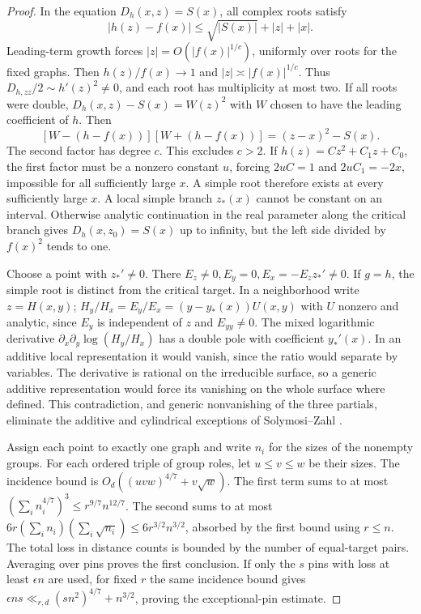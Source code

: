 \begin{proof}
In the equation \(D_h(x,z)=S(x)\), all complex roots satisfy
\[
 |h(z)-f(x)|\le\sqrt{|S(x)|}+|z|+|x|.
\]
Leading-term growth forces \(|z|=O(|f(x)|^{1/c})\), uniformly over roots for the fixed graphs. Then \(h(z)/f(x)\to1\) and \(|z|\asymp|f(x)|^{1/c}\). Thus \(D_{h,zz}/2\sim h'(z)^2\ne0\), and each root has multiplicity at most two. If all roots were double, \(D_h(x,z)-S(x)=W(z)^2\) with \(W\) chosen to have the leading coefficient of \(h\). Then
\[
 [W-(h-f(x))][W+(h-f(x))]=(z-x)^2-S(x).
\]
The second factor has degree \(c\). This excludes \(c>2\). If \(h(z)=Cz^2+C_1z+C_0\), the first factor must be a nonzero constant \(u\), forcing \(2uC=1\) and \(2uC_1=-2x\), impossible for all sufficiently large \(x\). A simple root therefore exists at every sufficiently large \(x\). A local simple branch \(z_*(x)\) cannot be constant on an interval. Otherwise analytic continuation in the real parameter along the critical branch gives \(D_h(x,z_0)=S(x)\) up to infinity, but the left side divided by \(f(x)^2\) tends to one.

Choose a point with \(z_*'\ne0\). There \(E_z\ne0,E_y=0,E_x=-E_z z_*'\ne0\). If \(g=h\), the simple root is distinct from the critical target. In a neighborhood write \(z=H(x,y)\); \(H_y/H_x=E_y/E_x=(y-y_*(x))U(x,y)\) with \(U\) nonzero and analytic, since \(E_y\) is independent of \(z\) and \(E_{yy}\ne0\). The mixed logarithmic derivative \(\partial_x\partial_y\log(H_y/H_x)\) has a double pole with coefficient \(y_*'(x)\). In an additive local representation it would vanish, since the ratio would separate by variables. The derivative is rational on the irreducible surface, so a generic additive representation would force its vanishing on the whole surface where defined. This contradiction, and generic nonvanishing of the three partials, eliminate the additive and cylindrical exceptions of Solymosi--Zahl \cite[Theorem 1.4]{sz}.

Assign each point to exactly one graph and write \(n_i\) for the sizes of the nonempty groups. For each ordered triple of group roles, let \(u\le v\le w\) be their sizes. The incidence bound is \(O_d((uvw)^{4/7}+v\sqrt w)\). The first term sums to at most \((\sum_i n_i^{4/7})^3\le r^{9/7}n^{12/7}\). The second sums to at most \(6r(\sum_i n_i)(\sum_i\sqrt{n_i})\le6r^{3/2}n^{3/2}\), absorbed by the first bound using \(r\le n\). The total loss in distance counts is bounded by the number of equal-target pairs. Averaging over pins proves the first conclusion. If only the \(s\) pins with loss at least \(\epsilon n\) are used, for fixed \(r\) the same incidence bound gives \(\epsilon ns\ll_{r,d}(sn^2)^{4/7}+n^{3/2}\), proving the exceptional-pin estimate.
\end{proof}
